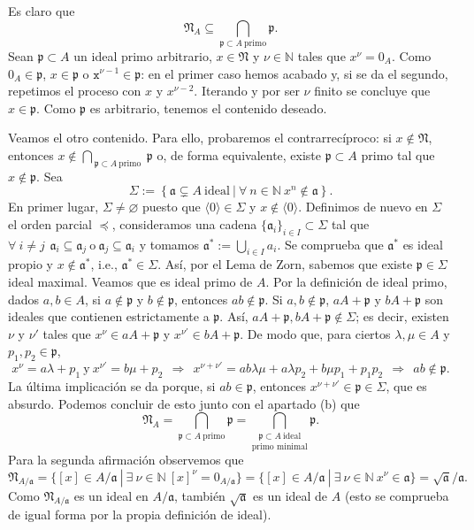 \documentclass[a4paper,12pt]{article}
\newcommand{\N}{\mathbb{N}}
\newcommand{\x}{\texttt{x}}
\newcommand{\p}{\mathfrak{p}}
\newcommand{\af}{\mathfrak{a}}
\newcommand{\Nf}{\mathfrak{N}}
\begin{document}
Es claro que $$\Nf_A\subseteq\underset{\p\subset A\ \text{primo}}{\bigcap}\p.$$ Sean $\p\subset A$ un ideal primo arbitrario, $x\in\Nf$ y $\nu\in\N$ tales que $x^\nu=0_A$. Como $0_A\in\p$, $x\in\p$ o $\x^{\nu-1}\in\p$: en el primer caso hemos acabado y, si se da el segundo, repetimos el proceso con $x$ y $x^{\nu-2}$. Iterando y por ser $\nu$ finito se concluye que $x\in\p$. Como $\p$ es arbitrario, tenemos el contenido deseado.

Veamos el otro contenido. Para ello, probaremos el contrarrecíproco: si $x\notin\Nf$, entonces $x\notin\bigcap_{\ \p\subset A\ \text{primo }}\p$ o, de forma equivalente, existe $\p\subset A$ primo tal que $x\notin\p$. Sea$$\Sigma:=\left\{\af\subsetneq A\ \text{ideal}\ |\ \forall\ n\in\N\ x^n\notin\af \right\}.$$
En primer lugar, $\Sigma\neq\varnothing$ puesto que $\langle 0\rangle\in\Sigma$ y $x\notin\langle 0\rangle$. 
Definimos de nuevo en $\Sigma$ el orden parcial $\preceq$, consideramos una cadena $\{\af_i\}_{i\in I}\subset\Sigma$ tal que $\forall\ i\neq j\hspace{5pt}\af_i\subseteq\af_j\ \text{o}\ \af_j\subseteq\af_i$ y tomamos $\af^*:=\bigcup_{i\in I}a_i$. Se comprueba que $\af^*$ es ideal propio y $x\notin\af^*$, i.e., $\af^*\in\Sigma$.\newline
Así, por el Lema de Zorn, sabemos que existe $\p\in\Sigma$ ideal maximal. Veamos que es ideal primo de $A$. Por la definición de ideal primo, dados $a,b\in A$, si $a\notin\p$ y $b\notin\p$, entonces $ab\notin\p$.
Si $a,b\notin\p$, $aA+\p$ y $bA+\p$ son ideales que contienen estrictamente a $\p$. Así, $aA+\p,bA+\p\notin\Sigma$; es decir, existen $\nu$ y $\nu'$ tales que $x^\nu\in aA+\p$ y $x^{\nu'}\in bA+\p$. 
De modo que, para ciertos $\lambda,\mu\in A$ y $p_1,p_2\in\p$,$$x^\nu=a\lambda+p_1\ \text{y}\  x^{\nu'}=b\mu+p_2~~\Rightarrow~~ x^{\nu+\nu'}=ab\lambda\mu+a\lambda p_2+b\mu p_1+p_1p_2~~\Rightarrow~~ ab\notin\p.$$
La última implicación se da porque, si $ab\in\p$, entonces $x^{\nu+\nu'}\in\p\in\Sigma$, que es absurdo.\newline
Podemos concluir de esto junto con el apartado (b) que$$\Nf_A=\underset{\p\subset A\ \text{primo}}{\bigcap}\p=\underset{\text{primo minimal}}{\bigcap_{\p\subset A\ \text{ideal}}}\p.$$
Para la segunda afirmación observemos que$$\Nf_{A/\af}=\{[x]\in A/\af\ |\ \exists\ \nu\in\N\ {[x]}^\nu=0_{A/\af}\}=\{[x]\in A/\af\ |\ \exists\ \nu\in\N\ x^\nu\in\af\}=\sqrt{\af}/\af.$$
Como $\Nf_{A/\af}$ es un ideal en $A/\af$, también $\sqrt{\af}$ es un ideal de $A$ (esto se comprueba de igual forma por la propia definición de ideal).
\end{document}
